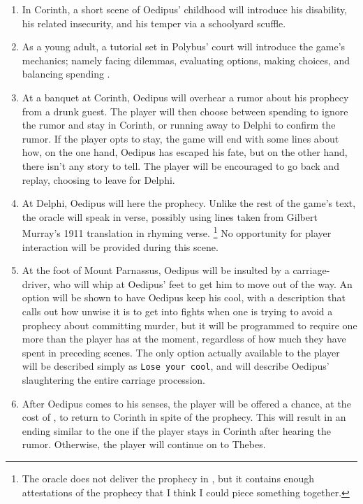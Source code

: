 \begin{enumerate}
\item In Corinth, a short scene of Oedipus' childhood will introduce his disability, his
  related insecurity, and his temper via a schoolyard scuffle.
\item As a young adult, a tutorial set in Polybus' court will introduce the game's
  mechanics; namely facing dilemmas, evaluating options, making choices, and balancing
  spending \selfcontrol{}.
\item At a banquet at Corinth, Oedipus will overhear a rumor about his prophecy from a
  drunk guest. The player will then choose between spending \selfcontrol{} to ignore the
  rumor and stay in Corinth, or running away to Delphi to confirm the rumor. If the player
  opts to stay, the game will end with some lines about how, on the one hand, Oedipus has
  escaped his fate, but on the other hand, there isn't any story to tell. The player will
  be encouraged to go back and replay, choosing to leave for Delphi.
\item At Delphi, Oedipus will here the prophecy. Unlike the rest of the game's text, the
  oracle will speak in verse, possibly using lines taken from Gilbert Murray's 1911
  translation in rhyming verse. \footnote{The oracle does not deliver the prophecy in
    \theplay{}, but it contains enough attestations of the prophecy that I think I could
    piece something together.} No opportunity for player interaction will be provided
  during this scene.
\item At the foot of Mount Parnassus, Oedipus will be insulted by a carriage-driver, who
  will whip at Oedipus' feet to get him to move out of the way. An option will be shown to
  have Oedipus keep his cool, with a description that calls out how unwise it is to get
  into fights when one is trying to avoid a prophecy about committing murder, but it will
  be programmed to require one more \selfcontrol{} than the player has at the moment,
  regardless of how much they have spent in preceding scenes. The only option actually
  available to the player will be described simply as \texttt{Lose your cool}, and will
  describe Oedipus' slaughtering the entire carriage procession.
\item After Oedipus comes to his senses, the player will be offered a chance, at the cost
  of \selfcontrol{}, to return to Corinth in spite of the prophecy. This will result in an
  ending similar to the one if the player stays in Corinth after hearing the
  rumor. Otherwise, the player will continue on to Thebes.

\end{enumerate}
